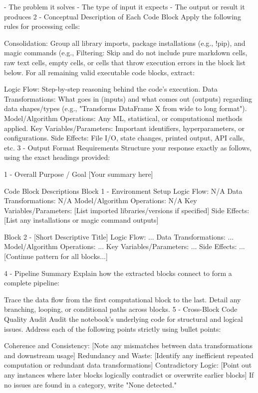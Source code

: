 \documentclass[11pt, a4paper]{article}
\begin{document}
\begin{description}
{	- The problem it solves
	- The type of input it expects
	- The output or result it produces
	2 - Conceptual Description of Each Code Block
	Apply the following rules for processing cells:
	
	Consolidation: Group all library imports, package installations (e.g., !pip), and magic commands (e.g., %
	Filtering: Skip and do not include pure markdown cells, raw text cells, empty cells, or cells that throw execution errors in the block list below.
	For all remaining valid executable code blocks, extract:
	
	Logic Flow: Step-by-step reasoning behind the code's execution.
	Data Transformations: What goes in (inputs) and what comes out (outputs) regarding data shapes/types (e.g., "Transforms DataFrame X from wide to long format").
	Model/Algorithm Operations: Any ML, statistical, or computational methods applied.
	Key Variables/Parameters: Important identifiers, hyperparameters, or configurations.
	Side Effects: File I/O, state changes, printed output, API calls, etc.
	3 - Output Format Requirements
	Structure your response exactly as follows, using the exact headings provided:
	
	1 - Overall Purpose / Goal
	[Your summary here]
	
	Code Block Descriptions
	Block 1 - Environment Setup
	Logic Flow: N/A
	Data Transformations: N/A
	Model/Algorithm Operations: N/A
	Key Variables/Parameters: [List imported libraries/versions if specified]
	Side Effects: [List any installations or magic command outputs]
	
	Block 2 - [Short Descriptive Title]
	Logic Flow: ...
	Data Transformations: ...
	Model/Algorithm Operations: ...
	Key Variables/Parameters: ...
	Side Effects: ...
	[Continue pattern for all blocks...]
	
	4 - Pipeline Summary
	Explain how the extracted blocks connect to form a complete pipeline:
	
	Trace the data flow from the first computational block to the last.
	Detail any branching, looping, or conditional paths across blocks.
	5 - Cross-Block Code Quality Audit
	Audit the notebook's underlying code for structural and logical issues. Address each of the following points strictly using bullet points:
	
	Coherence and Consistency: [Note any mismatches between data transformations and downstream usage]
	Redundancy and Waste: [Identify any inefficient repeated computation or redundant data transformations]
	Contradictory Logic: [Point out any instances where later blocks logically contradict or overwrite earlier blocks]
	If no issues are found in a category, write "None detected."
	
}
\end{description}
\end{document}
